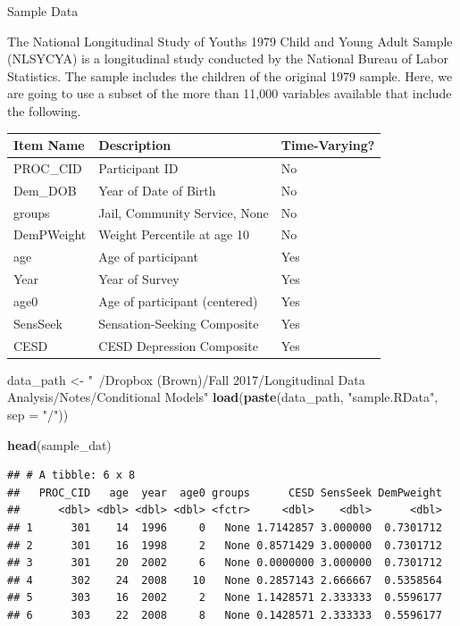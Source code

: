 \documentclass[ignorenonframetext,]{beamer}
\newenvironment{Shaded}{\begin{snugshade}}{\end{snugshade}}
\newcommand{\KeywordTok}[1]{\textcolor[rgb]{0.13,0.29,0.53}{\textbf{{#1}}}}
\newcommand{\DataTypeTok}[1]{\textcolor[rgb]{0.13,0.29,0.53}{{#1}}}
\newcommand{\StringTok}[1]{\textcolor[rgb]{0.31,0.60,0.02}{{#1}}}
\newcommand{\NormalTok}[1]{{#1}}
\begin{document}
\begin{frame}[fragile]{Sample Data}

The National Longitudinal Study of Youths 1979 Child and Young Adult
Sample (NLSYCYA) is a longitudinal study conducted by the National
Bureau of Labor Statistics. The sample includes the children of the
original 1979 sample. Here, we are going to use a subset of the more
than 11,000 variables available that include the following.

\begin{longtable}[]{@{}lll@{}}
\toprule
Item Name & Description & Time-Varying?\tabularnewline
\midrule
\endhead
PROC\_CID & Participant ID & No\tabularnewline
Dem\_DOB & Year of Date of Birth & No\tabularnewline
groups & Jail, Community Service, None & No\tabularnewline
DemPWeight & Weight Percentile at age 10 & No\tabularnewline
age & Age of participant & Yes\tabularnewline
Year & Year of Survey & Yes\tabularnewline
age0 & Age of participant (centered) & Yes\tabularnewline
SensSeek & Sensation-Seeking Composite & Yes\tabularnewline
CESD & CESD Depression Composite & Yes\tabularnewline
\bottomrule
\end{longtable}

\begin{Shaded}
\begin{Highlighting}[]
\NormalTok{data_path <-}\StringTok{ "~/Dropbox (Brown)/Fall 2017/Longitudinal Data Analysis/Notes/Conditional Models"}
\KeywordTok{load}\NormalTok{(}\KeywordTok{paste}\NormalTok{(data_path, }\StringTok{"sample.RData"}\NormalTok{, }\DataTypeTok{sep =} \StringTok{"/"}\NormalTok{))}

\KeywordTok{head}\NormalTok{(sample_dat)}
\end{Highlighting}
\end{Shaded}

\begin{verbatim}
## # A tibble: 6 x 8
##   PROC_CID   age  year  age0 groups      CESD SensSeek DemPweight
##      <dbl> <dbl> <dbl> <dbl> <fctr>     <dbl>    <dbl>      <dbl>
## 1      301    14  1996     0   None 1.7142857 3.000000  0.7301712
## 2      301    16  1998     2   None 0.8571429 3.000000  0.7301712
## 3      301    20  2002     6   None 0.0000000 3.000000  0.7301712
## 4      302    24  2008    10   None 0.2857143 2.666667  0.5358564
## 5      303    16  2002     2   None 1.1428571 2.333333  0.5596177
## 6      303    22  2008     8   None 0.1428571 2.333333  0.5596177
\end{verbatim}

\end{frame}
\end{document}
